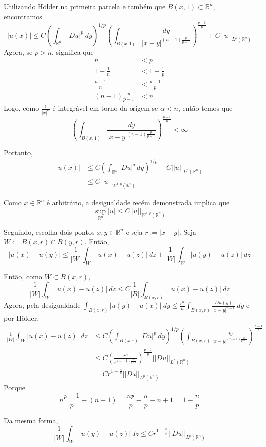 \documentclass[a4paper, 11pt]{article}
\newcommand{\Rn}{{\mathbb{R}^n}}
\newcommand{\rn}{{\mathbb{R}^n}}
\begin{document}
Utilizando Hölder na primeira parcela e também que $B(x,1) \subset \Rn$, encontramos \[ |u(x)| \leq C \left(\int_\Rn |Du|^p \ dy \right)^{1/p}      \left(  \int_{B(x,1)} \frac{dy}{|x-y|^{(n-1)\frac{p}{p-1}}}  \right)^{\frac{p-1}{p}}      + C ||u||_{L^p(\Rn)} \] Agora, se $p>n$, significa que \begin{align*}	n &< p \\
	1 - \tfrac{1}{n} &< 1 - \tfrac{1}{p} \\
	\frac{n-1}{n} &< \frac{p-1}{p}	\\
	(n-1)\frac{p}{p-1} &< n
\end{align*} Logo, como $ \frac{1}{|x|^\alpha} $ é integrável em torno da origem se $\alpha<n$, então temos que \[ \left(  \int_{B(x,1)} \frac{dy}{|x-y|^{(n-1)\frac{p}{p-1}}}  \right)^{\frac{p-1}{p}}< \infty \]

Portanto, \begin{align*}
	|u(x)| &\leq C \left(\int_\Rn |Du|^p \ dy \right)^{1/p}          + C ||u||_{L^p(\Rn)} \\
	&\leq C ||u||_{W^{1,p}(\Rn)}
\end{align*}

Como $x \in \rn$ é arbitrário, a desigualdade recém demonstrada implica que \[ \sup_{\rn} |u| \leq C ||u||_{W^{1,p}(\rn)} \]



Seguindo, escolha dois pontos $x,y \in \rn$ e seja $r:= |x-y|$. Seja $W:= B(x,r) \cap B(y,r)$. Então, \[ |u(x) - u(y)| \leq \frac{1}{|W|}\int_W |u(x) -u(z)|\ dz + \frac{1}{|W|} \int_W |u(y) - u(z)| \ dz\]

Então, como $W \subset B(x,r)$, \[ \frac{1}{|W|} \int_W |u(x) - u(z)| \ dz \leq C \frac{1}{|B|} \int_{B(x,r)} |u(x) - u(z)|\ dz \] Agora, pela desigualdade $ \int_{ B(x,r)} | u(y) - u(x) |\ dy \leq \frac{r^n}{n} \int_{B(x,r)} \frac{|Du(y)|}{|x-y|^{n-1}}\ dy  $ e por Hölder, \begin{align*}
	 \frac{1}{|W|} \int_W |u(x) - u(z)| \ dz &\leq C \left(\int_{B(x,r)} |Du|^p \ dy \right)^{1/p}      \left(  \int_{B(x,r)} \frac{dy}{|x-y|^{(n-1)\frac{p}{p-1}}}  \right)^{\frac{p-1}{p}} \\
	 &\leq C \left( \frac{r^n}{r^{(n-1)\frac{p}{p-1}}}\right)^{\frac{p-1}{p}} ||Du||_{L^p(\rn)} \\
	 &= Cr^{1-\frac{n}{p}} ||Du||_{L^p(\rn)}
\end{align*} Porque \[ n\frac{p-1}{p} - (n-1) = \frac{np}{p} - \frac{n}{p} -n + 1 = 1 - \frac{n}{p}\]

Da mesma forma, \[ \frac{1}{|W|} \int_W |u(y) - u(z)| \ dz \leq C r^{1-\frac{n}{p}} ||Du||_{L^p(\rn)} \]
\end{document}
